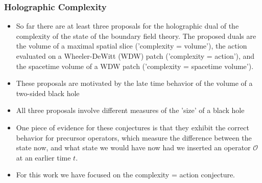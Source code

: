 \documentclass[10pt]{beamer}
\begin{document}
\begin{frame}
\frametitle{Holographic Complexity}

\begin{itemize}

\item So far there are at least three proposals for the holographic dual of the complexity of the state of the boundary field theory. The proposed duals are the volume of a maximal spatial slice ('complexity = volume'), the action evaluated on a Wheeler-DeWitt (WDW) patch ('complexity = action'), and the spacetime volume of a WDW patch ('complexity = spacetime volume'). 

\item These proposals are motivated by the late time behavior of the volume of a two-sided black hole

\item All three proposals involve different measures of the 'size' of a black hole

\item One piece of evidence for these conjectures is that they exhibit the correct behavior for precursor operators, which measure the difference between the state now, and what state we would have now had we inserted an operator $\mathcal{O}$ at an earlier time $t$. 

\item For this work we have focused on the complexity = action conjecture. 

\end{itemize}

\end{frame}
\end{document}
